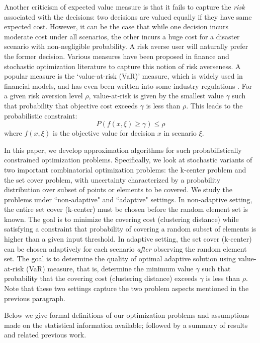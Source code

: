 \documentclass[11pt,onecolumn]{article}
\newcommand{\newtext}[1]{{#1}}
\begin{document}
Another criticism of expected value measure is that it fails to capture the {\it risk} associated with the decisions: two decisions are valued equally if they have same expected cost. However, it can be the case that while one decision incurs moderate cost under all scenarios, the other incurs a huge cost for a disaster scenario with non-negligible probability. A risk averse user will naturally prefer the former decision. 
Various measures have been proposed in finance and stochastic optimization literature to capture this notion of risk averseness. A popular measure is the `value-at-risk (VaR)' measure, which is widely used in financial models, and has even been written into some industry regulations \cite{VaR1, VaR2}. For a given risk aversion level $\rho$, value-at-risk is given by the smallest value $\gamma$ such that probability that objective cost exceeds $\gamma$ is less than $\rho$. This leads to the probabilistic constraint:
$$P(f(x,\xi) \ge \gamma) \le \rho$$
where $f(x,\xi)$ is the objective value for decision $x$ in scenario $\xi$.

\newtext{In this paper, we develop approximation algorithms for such probabilistically constrained optimization problems.
Specifically, we look at stochastic variants of two important combinatorial optimization problems: the k-center problem and the set cover problem, with uncertainty characterized by a probability distribution over subset of points or elements to be covered. We study the problems under ``non-adaptive" and ``adaptive" settings.
In non-adaptive
setting, the entire set cover (k-center) must be chosen before the random element set is known. The goal is to minimize the covering cost (clustering distance) while satisfying a constraint that probability of covering a random subset of elements is higher than a given input threshold. In adaptive setting, the set cover (k-center) can be chosen adaptively for each scenario {\it after} observing the random element set. The goal is to determine the quality of optimal adaptive solution using value-at-risk (VaR) measure, that is, determine the minimum value $\gamma$ such that probability that the covering cost (clustering distance) exceeds $\gamma$ is less than $\rho$. Note that these two settings capture the two problem aspects mentioned in the previous paragraph.
}

Below we give formal definitions of our optimization problems and assumptions made on the statistical information available; followed by a summary of results and related previous work.
\end{document}
